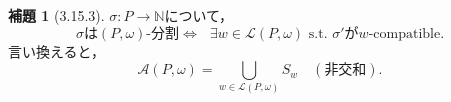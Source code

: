 \documentclass[xelatex,ja=standard,a4paper,14pt,everyparhook=compat]{bxjsarticle}
\newcommand{\bbN}{\mathbb{N}}
\newcommand{\mcA}{\mathcal{A}}
\newcommand{\mcL}{\mathcal{L}}
\theoremstyle{definition}
\newtheorem*{lemma}{補題}
\begin{document}
\begin{lemma}[3.15.3]
    $\sigma : P \to \bbN$について， \begin{equation*}
        \text{$\sigma$は$(P,\omega)$-分割$\iff$ $\exists w \in \mcL(P,\omega)$ s.t. $\sigma'$が$w$-compatible.}
    \end{equation*}
    言い換えると， \begin{equation*}
        \mcA(P,\omega) = \bigcup_{w \in \mcL(P,\omega)} S_w \quad (\text{非交和}).
    \end{equation*}
\end{lemma}
\end{document}
